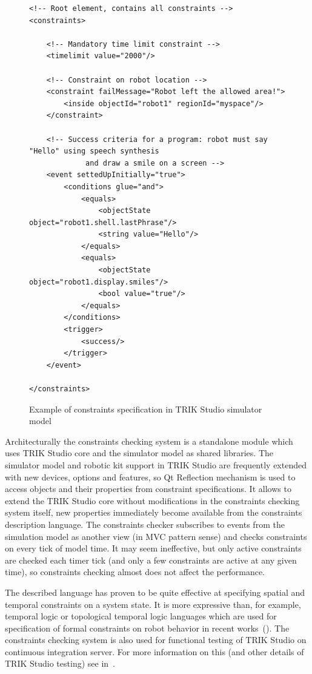 \documentclass[conference]{IEEEtran}
\begin{document}
\captionsetup[figure]{name=Listing}
\setcounter{figure}{0}

\begin{figure}[!t]
\begin{verbatim}
<!-- Root element, contains all constraints -->
<constraints>

    <!-- Mandatory time limit constraint -->
    <timelimit value="2000"/>

    <!-- Constraint on robot location -->
    <constraint failMessage="Robot left the allowed area!">
        <inside objectId="robot1" regionId="myspace"/>
    </constraint>

    <!-- Success criteria for a program: robot must say "Hello" using speech synthesis 
		     and draw a smile on a screen -->
    <event settedUpInitially="true">
        <conditions glue="and">
            <equals>
                <objectState object="robot1.shell.lastPhrase"/>
                <string value="Hello"/>
            </equals>
            <equals>
                <objectState object="robot1.display.smiles"/>
                <bool value="true"/>
            </equals>
        </conditions>
        <trigger>
            <success/>
        </trigger>
    </event>

</constraints>
\end{verbatim}
\caption{Example of constraints specification in TRIK Studio simulator model}
\label{code:constraints}
\end{figure}

Architecturally the constraints checking system is a standalone module which uses TRIK Studio core and the simulator model as shared libraries. The simulator model and robotic kit support in TRIK Studio are frequently extended with new devices, options and features, so Qt Reflection mechanism is used to access objects and their properties from constraint specifications. It allows to extend the TRIK Studio core without modifications in the constraints checking system itself, new properties immediately become available from the constraints description language. The constraints checker subscribes to events from the simulation model as another view (in MVC pattern sense) and checks constraints on every tick of model time. It may seem ineffective, but only active constraints are checked each timer tick (and only a few constraints are active at any given time), so constraints checking almost does not affect the performance.

The described language has proven to be quite effective at specifying spatial and temporal constraints on a system state. It is more expressive than, for example, temporal logic or topological temporal logic languages which are used for specification of formal constraints on robot behavior in recent works~(\cite{mordvinov2016formal,kress2007s,бугайченко2007разработка,дмитриев2013адаптация}). The constraints checking system is also used for functional testing of TRIK Studio on continuous integration server. For more information on this (and other details of TRIK Studio testing) see in~\cite{mordvinov2016testing}.
\end{document}
